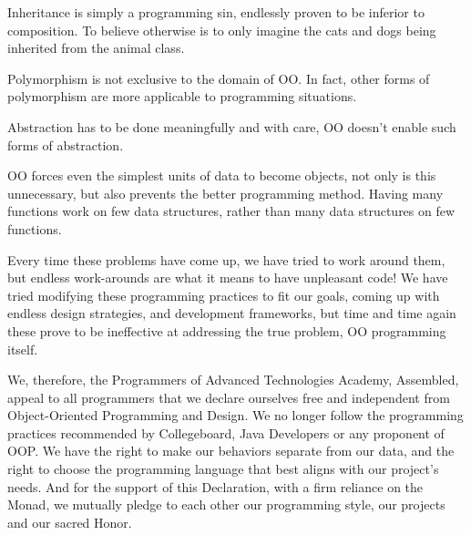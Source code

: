 \documentclass{article}
\begin{document}
Inheritance is simply a programming sin, endlessly proven to be inferior to composition. To believe otherwise is to only imagine the cats and dogs being inherited from the animal class.

Polymorphism is not exclusive to the domain of OO. In fact, other forms of polymorphism are more applicable to programming situations.

Abstraction has to be done meaningfully and with care, OO doesn't enable such forms of abstraction.

OO forces even the simplest units of data to become objects, not only is this unnecessary, but also prevents the better programming method. Having many functions work on few data structures, rather than many data structures on few functions.

Every time these problems have come up, we have tried to work around them, but endless work-arounds are what it means to have unpleasant code! We have tried modifying these programming practices to fit our goals, coming up with endless design strategies, and development frameworks, but time and time again these prove to be ineffective at addressing the true problem, OO programming itself.

We, therefore, the Programmers of Advanced Technologies Academy, Assembled, appeal to all programmers that we declare ourselves free and independent from Object-Oriented Programming and Design. We no longer follow the programming practices recommended by Collegeboard, Java Developers or any proponent of OOP. We have the right to make our behaviors separate from our data, and the right to choose the programming language that best aligns with our project's needs. And for the support of this Declaration, with a firm reliance on the Monad, we mutually pledge to each other our programming style, our projects and our sacred Honor.
\\
\end{document}
